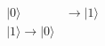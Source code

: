 \documentclass[preview]{standalone}
\begin{document}
\begin{align*}
|0\rangle &\longrightarrow |1\rangle \\ |1\rangle \longrightarrow |0\rangle
\end{align*}
\end{document}
